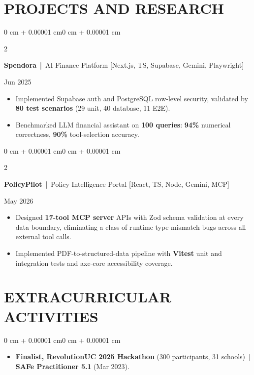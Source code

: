 \documentclass[10pt, letterpaper]{article}
\newenvironment{highlights}{
    \begin{itemize}[
        topsep=0.10 cm,
        parsep=0.06 cm,
        partopsep=0pt,
        itemsep=0.06 cm,
        leftmargin=12pt
    ]
}{
    \end{itemize}
}
\newenvironment{onecolentry}{
    \begin{adjustwidth}{0 cm + 0.00001 cm}{0 cm + 0.00001 cm}
}{
    \end{adjustwidth}
}
\newenvironment{twocolentry}[2][]{
    \onecolentry
    \def\secondColumn{#2}
    \setcolumnwidth{\fill, 4.5 cm}
    \begin{paracol}{2}
}{
    \switchcolumn \raggedleft \secondColumn
    \end{paracol}
    \endonecolentry
}
\begin{document}
\section{PROJECTS AND RESEARCH}
\begin{twocolentry}{Jun 2025}
\textbf{Spendora} \,|\, AI Finance Platform [Next.js, TS, Supabase, Gemini, Playwright]
\end{twocolentry}
\begin{highlights}
  \item Implemented Supabase auth and PostgreSQL row-level security, validated by \textbf{80 test scenarios} (29 unit, 40 database, 11 E2E).
  \item Benchmarked LLM financial assistant on \textbf{100 queries}: \textbf{94\%} numerical correctness, \textbf{90\%} tool-selection accuracy.
\end{highlights}

\vspace{0.12 cm}

\begin{twocolentry}{May 2026}
\textbf{PolicyPilot} \,|\, Policy Intelligence Portal [React, TS, Node, Gemini, MCP]
\end{twocolentry}
\begin{highlights}
  \item Designed \textbf{17-tool MCP server} APIs with Zod schema validation at every data boundary, eliminating a class of runtime type-mismatch bugs across all external tool calls.
  \item Implemented PDF-to-structured-data pipeline with \textbf{Vitest} unit and integration tests and axe-core accessibility coverage.
\end{highlights}

\section{EXTRACURRICULAR ACTIVITIES}
\begin{onecolentry}
\begin{highlights}
  \item \textbf{Finalist, RevolutionUC 2025 Hackathon} (300 participants, 31 schools) \,|\, \textbf{SAFe Practitioner 5.1} (Mar 2023).
\end{highlights}
\end{onecolentry}
\end{document}
